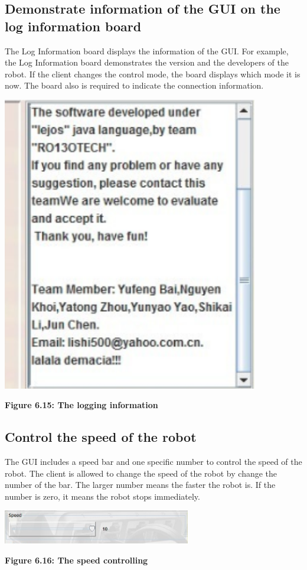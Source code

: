 \documentclass[11pt, a4paper]{report}
\begin{document}
\subsection{Demonstrate information of the GUI on the log information board}
The Log Information board displays the information of the GUI. For example, the Log Information board demonstrates the version and the developers of the robot. If the client changes the control mode, the board displays which mode it is now. The board also is required to indicate the connection information.
  \begin{center}
 \includegraphics[width=11.20cm]{board}
\end{center}
\begin{center}
\textbf {Figure 6.15: The logging information} \\[0.3cm]
\end{center}
\subsection{Control the speed of the robot}
The GUI includes a speed bar and one specific number to control the speed of the robot. The client is allowed to change the speed of the robot by change the number of the bar. The larger number means the faster the robot is. If the number is zero, it means the robot stops immediately.
  \begin{center}
 \includegraphics[width=8.20cm]{bar}
\end{center}
\begin{center}
\textbf {Figure 6.16: The speed controlling} \\[0.3cm]
\end{center}
\end{document}
